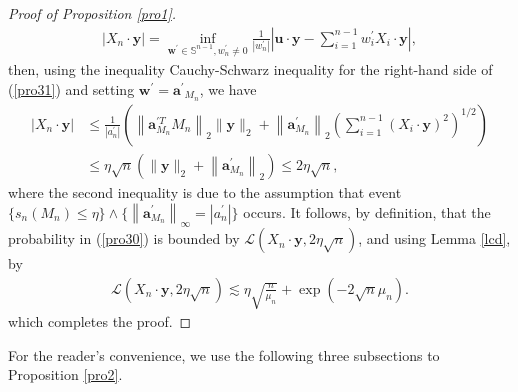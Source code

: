 \documentclass{article}
\numberwithin{equation}{section}
\theoremstyle{plain}
\begin{document}
\begin{proof}[Proof of Proposition \ref{pro1}]
\begin{align}
\left|X_n \cdot \boldsymbol{y}\right|  =\inf _{\boldsymbol{w}^{\prime} \in \mathbb{S}^{n-1}, w_n^{\prime} \neq 0} \frac{1}{\left|w_n^{\prime}\right|}\left|\boldsymbol{u} \cdot \boldsymbol{y}-\sum_{i=1}^{n-1} w_i^{\prime} X_i \cdot \boldsymbol{y}\right|,
\end{align}
then, using the inequality Cauchy-Schwarz inequality for the right-hand side of (\ref{pro31}) and setting $\boldsymbol{w}^{\prime}=\boldsymbol{a}^{\prime}{ }_{M_n}$, we have
\begin{align*}
\left|X_n \cdot \boldsymbol{y}\right|&\leq\frac{1}{\left|a_n^{\prime}\right|}\left(\left\|\boldsymbol{a}_{M_n}^{\prime T} M_n\right\|_2\|\boldsymbol{y}\|_2+\left\|\boldsymbol{a}_{M_n}^{\prime}\right\|_2\left(\sum_{i=1}^{n-1}\left(X_i \cdot \boldsymbol{y}\right)^2\right)^{1 / 2}\right)\\
&\leq\eta\sqrt{n}\left(\|\boldsymbol{y}\|_2+\left\|\boldsymbol{a}_{M_n}^{\prime}\right\|_2\right) \leq 2 \eta \sqrt{n},
\end{align*}
where the second inequality is due to the assumption that event $\{s_n\left(M_n\right) \leq \eta\} \wedge\{\left\|\boldsymbol{a}^{\prime}_{M_n}\right\|_{\infty}=\left|a_n^{\prime}\right|\}$ occurs. It follows, by definition, that the probability in (\ref{pro30}) is bounded by $\mathcal{L}\left(X_n \cdot \boldsymbol{y}, 2 \eta \sqrt{n}\right)$, and using Lemma \ref{lcd}, by
\begin{align*}
\mathcal{L}\left(X_n \cdot \boldsymbol{y}, 2 \eta \sqrt{n}\right) \lesssim \eta \sqrt{\frac{n}{\mu_{n}}}+\exp (-2\sqrt{n}\mu_{n}).
\end{align*}
which completes the proof.
\end{proof}
For the reader's convenience, we use the following three subsections to Proposition \ref{pro2}.
\end{document}

